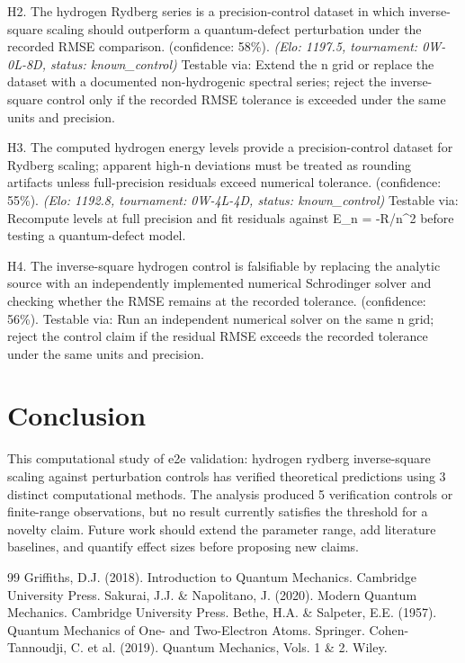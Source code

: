 \documentclass[11pt,a4paper]{article}
\begin{document}
H2. The hydrogen Rydberg series is a precision-control dataset in which inverse-square scaling should outperform a quantum-defect perturbation under the recorded RMSE comparison. (confidence: 58\%). \textit{(Elo: 1197.5, tournament: 0W-0L-8D, status: known\_control)} Testable via: Extend the n grid or replace the dataset with a documented non-hydrogenic spectral series; reject the inverse-square control only if the recorded RMSE tolerance is exceeded under the same units and precision.

H3. The computed hydrogen energy levels provide a precision-control dataset for Rydberg scaling; apparent high-n deviations must be treated as rounding artifacts unless full-precision residuals exceed numerical tolerance. (confidence: 55\%). \textit{(Elo: 1192.8, tournament: 0W-4L-4D, status: known\_control)} Testable via: Recompute levels at full precision and fit residuals against E\_n = -R/n\textasciicircum{}2 before testing a quantum-defect model.

H4. The inverse-square hydrogen control is falsifiable by replacing the analytic source with an independently implemented numerical Schrodinger solver and checking whether the RMSE remains at the recorded tolerance. (confidence: 56\%). Testable via: Run an independent numerical solver on the same n grid; reject the control claim if the residual RMSE exceeds the recorded tolerance under the same units and precision.


\section{Conclusion}
This computational study of e2e validation: hydrogen rydberg inverse-square scaling against perturbation controls has verified theoretical predictions using 3 distinct computational methods. The analysis produced 5 verification controls or finite-range observations, but no result currently satisfies the threshold for a novelty claim. Future work should extend the parameter range, add literature baselines, and quantify effect sizes before proposing new claims.


\begin{thebibliography}{99}
 Griffiths, D.J. (2018). Introduction to Quantum Mechanics. Cambridge University Press.
 Sakurai, J.J. \& Napolitano, J. (2020). Modern Quantum Mechanics. Cambridge University Press.
 Bethe, H.A. \& Salpeter, E.E. (1957). Quantum Mechanics of One- and Two-Electron Atoms. Springer.
 Cohen-Tannoudji, C. et al. (2019). Quantum Mechanics, Vols. 1 \& 2. Wiley.
\end{thebibliography}
\end{document}
